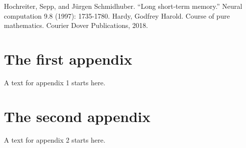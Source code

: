 \documentclass{report}
\begin{document}
\renewcommand\bibname{참고문헌(서지)}
\begin{thebibliography}{AA}
 Hochreiter, Sepp, and Jürgen Schmidhuber. ``Long short-term memory.'' Neural computation 9.8 (1997): 1735-1780.
 Hardy, Godfrey Harold. Course of pure mathematics. Courier Dover Publications, 2018.
\end{thebibliography}
%
%
%

\appendix
{}
\chapter{The first  appendix}
A text for appendix 1 starts here.
\chapter{The second appendix}
A text for appendix 2 starts here.

\printindex
\end{document}
